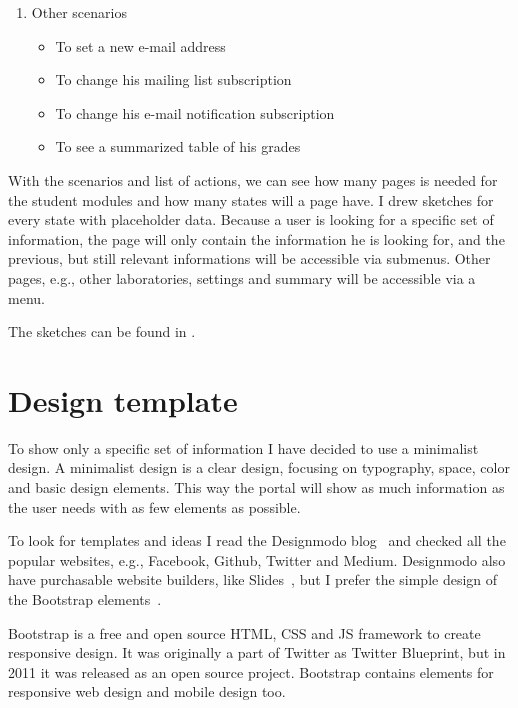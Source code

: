\begin{enumerate}
	\item Other scenarios
	\begin{itemize}
		\item To set a new e-mail address
		\item To change his mailing list subscription
		\item To change his e-mail notification subscription
		\item To see a summarized table of his grades
	\end{itemize}
	
\end{enumerate}

With the scenarios and list of actions, we can see how many pages is needed for the student modules and how many states will a page have. I drew sketches for every state with placeholder data. Because a user is looking for a specific set of information, the page will only contain the information he is looking for, and the previous, but still relevant informations will be accessible via submenus. Other pages, e.g., other laboratories, settings and summary will be accessible via a menu.


The sketches can be found in .

\section{Design template}

To show only a specific set of information I have decided to use a minimalist design. A minimalist design is a clear design, focusing on typography, space, color and basic design elements. This way the portal will show as much information as the user needs with as few elements as possible. 

To look for templates and ideas I read the Designmodo blog~\cite{Designmodo} and checked all the popular websites, e.g., Facebook, Github, Twitter and Medium. Designmodo also have purchasable website builders, like Slides~\cite{Designmodo-slides}, but I prefer the simple design of the Bootstrap elements~\cite{Bootstrap}. 

Bootstrap is a free and open source HTML, CSS and JS framework to create responsive design. It was originally a part of Twitter as Twitter Blueprint, but in 2011 it was released as an open source project. Bootstrap contains elements for responsive web design and mobile design too.


